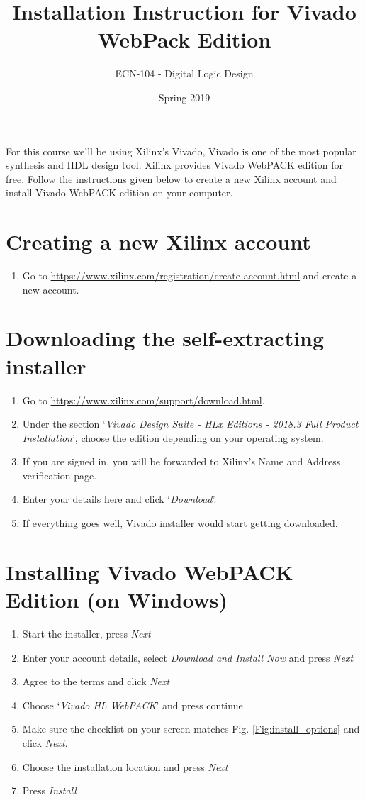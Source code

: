 \documentclass{article}
\title{Installation Instruction for Vivado WebPack Edition}
\author{ECN-104 - Digital Logic Design }
\date{Spring 2019}
\begin{document}
\maketitle

For this course we'll be using Xilinx's Vivado, Vivado is one of the
most popular synthesis and HDL design tool. Xilinx provides Vivado
WebPACK edition for free. Follow the instructions given below to
create a new Xilinx account and install Vivado WebPACK edition on your
computer.

\section{Creating a new Xilinx account}
\begin{enumerate}
\item Go to
  \url{https://www.xilinx.com/registration/create-account.html} and
  create a new account.
\end{enumerate}

\section{Downloading the self-extracting installer}
\begin{enumerate}
\item Go to \url{https://www.xilinx.com/support/download.html}.
\item Under the section `\textit{Vivado Design Suite - HLx Editions -
    2018.3 Full Product Installation}', choose the edition depending
  on your operating system.
\item If you are signed in, you will be forwarded to Xilinx's Name and
  Address verification page.
\item Enter your details here and click `\textit{Download}'.
\item If everything goes well, Vivado installer would start getting
  downloaded.
\end{enumerate}

\section{Installing Vivado WebPACK Edition (on Windows)}
\begin{enumerate}
    \item Start the installer, press \textit{Next}
    \item Enter your account details, select \textit{Download and
        Install Now} and press \textit{Next}
    \item Agree to the terms and click \textit{Next}
    \item Choose `\textit{Vivado HL WebPACK}' and press continue
    \item Make sure the checklist on your screen matches
      Fig. \ref{Fig:install_options} and click \textit{Next}.
    \item Choose the installation location and press \textit{Next}
    \item Press \textit{Install}
\end{enumerate}
\end{document}
